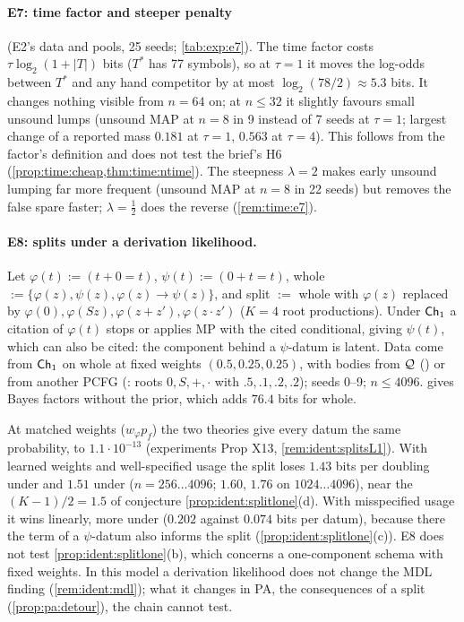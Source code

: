 \paragraph{E7: time factor and steeper penalty} (E2's data and pools, 25 seeds; \cref{tab:exp:e7}).
The time factor costs $\tau\log_2(1+|T|)$ bits ($T^*$ has 77 symbols), so at $\tau=1$ it moves the log-odds between $T^*$ and any hand competitor by at most $\log_2(78/2)\approx5.3$ bits. It changes nothing visible from $n=64$ on; at $n\le32$ it slightly favours small unsound lumps (unsound MAP at $n=8$ in 9 instead of 7 seeds at $\tau=1$; largest change of a reported mass $0.181$ at $\tau=1$, $0.563$ at $\tau=4$). This follows from the factor's definition and does not test the brief's H6 (\cref{prop:time:cheap,thm:time:ntime}). The steepness $\lambda=2$ makes early unsound lumping far more frequent (unsound MAP at $n=8$ in 22 seeds) but removes the false spare faster; $\lambda=\tfrac12$ does the reverse (\cref{rem:time:e7}).

\paragraph{E8: splits under a derivation likelihood.}
Let $\varphi(t):=(t+0=t)$, $\psi(t):=(0+t=t)$, whole $:=\{\varphi(z),\psi(z),\varphi(z)\to\psi(z)\}$, and split $:=$ whole with $\varphi(z)$ replaced by $\varphi(0),\varphi(Sz),\varphi(z+z'),\varphi(z\cdot z')$ ($K=4$ root productions). Under $\mathsf{Ch}_{1}$ a citation of $\varphi(t)$ stops or applies MP with the cited conditional, giving $\psi(t)$, which can also be cited: the component behind a $\psi$-datum is latent. Data come from $\mathsf{Ch}_{1}$ on whole at fixed weights $(0.5,0.25,0.25)$, with bodies from $\mathcal{Q}$ () or from another PCFG (: roots $0,S,+,\cdot$ with $.5,.1,.2,.2$); seeds 0--9; $n\le4096$.  gives Bayes factors without the prior, which adds $76.4$ bits for whole.

\noindent At matched weights ($w_\varphi p_f$) the two theories give every datum the same \Lone{} probability, to $1.1\cdot10^{-13}$ (experiments Prop X13, \cref{rem:ident:splitsL1}). With learned weights and well-specified usage the split loses $1.43$ bits per doubling under \Lone{} and $1.51$ under \Lzero{} ($n=256\ldots4096$; $1.60$, $1.76$ on $1024\ldots4096$), near the $(K-1)/2=1.5$ of conjecture \cref{prop:ident:splitlone}(d). With misspecified usage it wins linearly, more under \Lone{} ($0.202$ against $0.074$ bits per datum), because there the term of a $\psi$-datum also informs the split (\cref{prop:ident:splitlone}(c)). E8 does not test \cref{prop:ident:splitlone}(b), which concerns a one-component schema with fixed weights. In this model a derivation likelihood does not change the MDL finding (\cref{rem:ident:mdl}); what it changes in PA, the consequences of a split (\cref{prop:pa:detour}), the chain cannot test.

